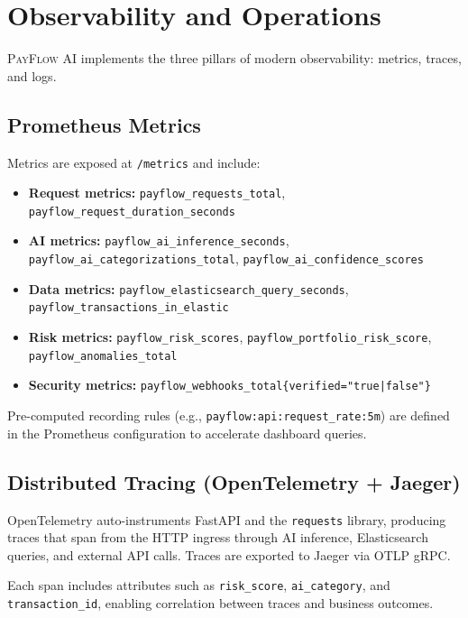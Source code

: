 \documentclass[11pt,a4paper]{article}
\newcommand{\payflow}{\textsc{PayFlow AI}}
\begin{document}
\section{Observability and Operations}
\label{sec:observability}

\payflow{} implements the three pillars of modern observability: metrics, traces, and logs.

\subsection{Prometheus Metrics}
\label{subsec:metrics}

Metrics are exposed at \texttt{/metrics} and include:

\begin{itemize}[leftmargin=*]
  \item \textbf{Request metrics:} \texttt{payflow\_requests\_total}, \texttt{payflow\_request\_duration\_seconds}
  \item \textbf{AI metrics:} \texttt{payflow\_ai\_inference\_seconds}, \texttt{payflow\_ai\_categorizations\_total}, \texttt{payflow\_ai\_confidence\_scores}
  \item \textbf{Data metrics:} \texttt{payflow\_elasticsearch\_query\_seconds}, \texttt{payflow\_transactions\_in\_elastic}
  \item \textbf{Risk metrics:} \texttt{payflow\_risk\_scores}, \texttt{payflow\_portfolio\_risk\_score}, \texttt{payflow\_anomalies\_total}
  \item \textbf{Security metrics:} \texttt{payflow\_webhooks\_total\{verified="true|false"\}}
\end{itemize}

Pre-computed recording rules (e.g., \texttt{payflow:api:request\_rate:5m}) are defined in the Prometheus configuration to accelerate dashboard queries.

\subsection{Distributed Tracing (OpenTelemetry + Jaeger)}
\label{subsec:tracing}

OpenTelemetry auto-instruments FastAPI and the \texttt{requests} library, producing traces that span from the HTTP ingress through AI inference, Elasticsearch queries, and external API calls. Traces are exported to Jaeger via OTLP gRPC.

Each span includes attributes such as \texttt{risk\_score}, \texttt{ai\_category}, and \texttt{transaction\_id}, enabling correlation between traces and business outcomes.
\end{document}
